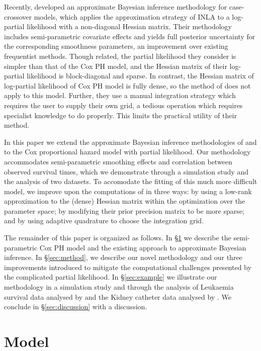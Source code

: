 \documentclass[ba]{imsart}
\begin{document}
Recently, \cite{casecross} developed an approximate Bayesian inference methodology for case-crossover models, which applies the approximation strategy of INLA to a log-partial likelihood with a non-diagonal Hessian matrix. Their methodology includes semi-parametric covariate effects and yields full posterior uncertainty for the corresponding smoothness parameters, an improvement over existing frequentist methods. Though related, the partial likelihood they consider is simpler than that of the Cox PH model, and the Hessian matrix of their log-partial likelihood is block-diagonal and sparse. In contrast, the Hessian matrix of log-partial likelihood of Cox PH model is fully dense, so the method of \cite{casecross} does not apply to this model. Further, they use a manual integration strategy which requires the user to supply their own grid, a tedious operation which requires specialist knowledge to do properly. This limits the practical utility of their method.

In this paper we extend the approximate Bayesian inference methodologies of \cite{casecross} and \cite{inlacoxph} to the Cox proportional hazard model with partial likelihood. Our methodology accommodates semi-parametric smoothing effects and correlation between observed survival times, which we demonstrate through a simulation study and the analysis of two datasets. To accomodate the fitting of this much more difficult model, we improve upon the computations of \cite{casecross} in three ways: by using a low-rank approximation to the (dense) Hessian matrix within the optimization over the parameter space; by modifying their prior precision matrix to be more sparse; and by using adaptive quadrature to choose the integration grid.

The remainder of this paper is organized as follows. In \S\ref{sec:model} we describe the semi-parametric Cox PH model and the existing approach to approximate Bayesian inference. In \S\ref{sec:method}, we describe our novel methodology and our three improvements introduced to mitigate the computational challenges presented by the complicated partial likelihood. In \S\ref{sec:example} we illustrate our methodology in a simulation study and through the analysis of Leukaemia survival data analysed by \cite{inlacoxph} and the Kidney catheter data analysed by \cite{kidney}. We conclude in \S\ref{sec:discussion} with a discussion.

\section{Model}\label{sec:model}
\end{document}
